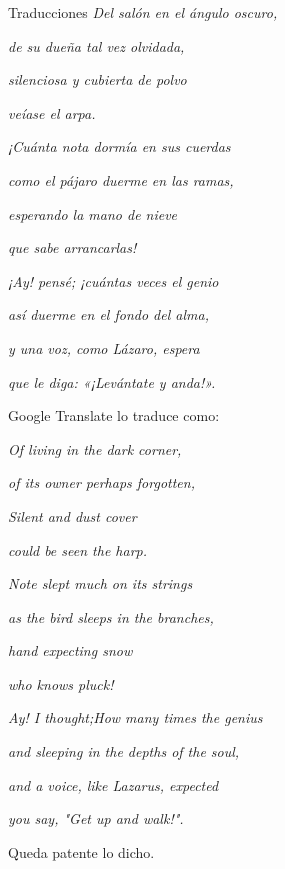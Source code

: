 \documentclass[spanish, a4paper, 12pt]{article} 	%
\begin{document}
\begin{section}{Traducciones}
\textit{Del salón en el ángulo oscuro, 
}	

\textit{de su dueña tal vez olvidada, 
}

\textit{silenciosa y cubierta de polvo 
}

\textit{veíase el arpa. 
}

\textit{¡Cuánta nota dormía en sus cuerdas 
}

\textit{como el pájaro duerme en las ramas, 
}

\textit{esperando la mano de nieve 
}

\textit{que sabe arrancarlas! 
}

\textit{¡Ay! pensé; ¡cuántas veces el genio 
}

\textit{así duerme en el fondo del alma, 
}

\textit{y una voz, como Lázaro, espera 
}

\textit{que le diga: «¡Levántate y anda!».
}

\vspace{0.5cm}

Google Translate lo traduce como: 

\vspace{0.5cm}

\textit{Of living in the dark corner, }

\textit{of its owner perhaps forgotten, }

\textit{Silent and dust cover} 

\textit{could be seen the harp. }

\textit{Note slept much on its strings }

\textit{as the bird sleeps in the branches, }

\textit{hand expecting snow} 

\textit{who knows pluck!} 


\textit{Ay! I thought;How many times the genius }

\textit{and sleeping in the depths of the soul, }

\textit{and a voice, like Lazarus, expected} 

\textit{you say, "Get up and walk!".}
	
\vspace{0.5cm}

Queda patente lo dicho.
	
\end{section}
\end{document}
